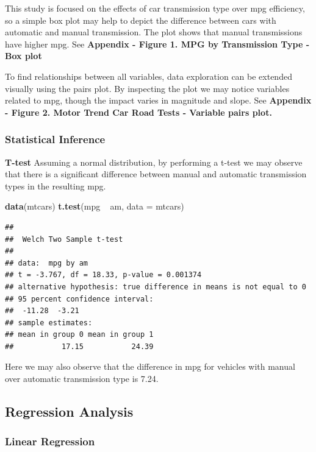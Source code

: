 \documentclass[]{article}
\newenvironment{Shaded}{\begin{snugshade}}{\end{snugshade}}
\newcommand{\KeywordTok}[1]{\textcolor[rgb]{0.13,0.29,0.53}{\textbf{{#1}}}}
\newcommand{\DataTypeTok}[1]{\textcolor[rgb]{0.13,0.29,0.53}{{#1}}}
\newcommand{\StringTok}[1]{\textcolor[rgb]{0.31,0.60,0.02}{{#1}}}
\newcommand{\NormalTok}[1]{{#1}}
\begin{document}
This study is focused on the effects of car transmission type over mpg
efficiency, so a simple box plot may help to depict the difference
between cars with automatic and manual transmission. The plot shows that
manual transmissions have higher mpg. See \textbf{Appendix - Figure 1.
MPG by Transmission Type - Box plot}

To find relationships between all variables, data exploration can be
extended visually using the pairs plot. By inspecting the plot we may
notice variables related to mpg, though the impact varies in magnitude
and slope. See \textbf{Appendix - Figure 2. Motor Trend Car Road Tests -
Variable pairs plot.}

\subsubsection{Statistical Inference}\label{statistical-inference}

\textbf{T-test} Assuming a normal distribution, by performing a t-test
we may observe that there is a significant difference between manual and
automatic transmission types in the resulting mpg.

\begin{Shaded}
\begin{Highlighting}[]
\KeywordTok{data}\NormalTok{(mtcars)}
\KeywordTok{t.test}\NormalTok{(mpg ~}\StringTok{ }\NormalTok{am, }\DataTypeTok{data =} \NormalTok{mtcars)}
\end{Highlighting}
\end{Shaded}

\begin{verbatim}
## 
##  Welch Two Sample t-test
## 
## data:  mpg by am
## t = -3.767, df = 18.33, p-value = 0.001374
## alternative hypothesis: true difference in means is not equal to 0
## 95 percent confidence interval:
##  -11.28  -3.21
## sample estimates:
## mean in group 0 mean in group 1 
##           17.15           24.39
\end{verbatim}

Here we may also observe that the difference in mpg for vehicles with
manual over automatic transmission type is 7.24.

\subsection{Regression Analysis}\label{regression-analysis}

\subsubsection{Linear Regression}\label{linear-regression}
\end{document}
